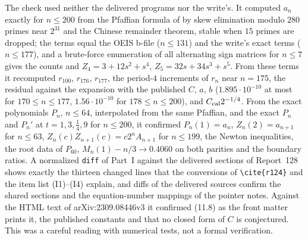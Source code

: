 \documentclass[11pt,letterpaper]{article}
\theoremstyle{remark}\newtheorem{remark}[theorem]{Remark}
\begin{document}
The check used neither the delivered programs nor the write's. It computed $a_n$ exactly for $n\le200$ from the Pfaffian formula of \cite[Corollary~4.2]{bfk} by skew elimination modulo $280$ primes near $2^{31}$ and the Chinese remainder theorem, stable when $15$ primes are dropped; the terms equal the OEIS b-file ($n\le131$) and the write's exact terms ($n\le177$), and a brute-force enumeration of all alternating sign matrices for $n\le7$ gives the counts and $Z_4=3+12s^2+s^4$, $Z_5=32s+34s^3+s^5$. From these terms it recomputed $r_{100}$, $r_{176}$, $r_{177}$, the period-$4$ increments of $r_n$ near $n=175$, the residual against the expansion \cite[(11.8)]{bfk} with the published $C$, $a$, $b$ ($1.895\cdot10^{-10}$ at most for $170\le n\le177$, $1.56\cdot10^{-10}$ for $178\le n\le200$), and $C_{\rm cal}2^{-1/4}$. From the exact polynomials $P_n$, $n\le64$, interpolated from the same Pfaffian, and the exact $P_n$ and $P_n'$ at $t=1,3,\frac14,9$ for $n\le200$, it confirmed $P_n(1)=a_n$, $Z_n(2)=a_{n+1}$ for $n\le63$, $Z_n(c)Z_{n+1}(c)=c2^nA_{n+1}$ for $n\le199$, the Newton inequalities, the root data of $P_{60}$, $M_n(1)-n/3\to0.4060$ on both parities and the boundary ratios. A normalized \texttt{diff} of Part~I against the delivered sections of Report~128 shows exactly the thirteen changed lines that the conversions of \verb|\cite{r124}| and the item list (I1)--(I4) explain, and diffs of the delivered sources confirm the shared sections and the equation-number mappings of the pointer notes. Against the HTML text of arXiv:2309.08446v3 it confirmed (11.8) as the front matter prints it, the published constants and that no closed form of $C$ is conjectured. This was a careful reading with numerical tests, not a formal verification.
\clearpage
\end{document}
